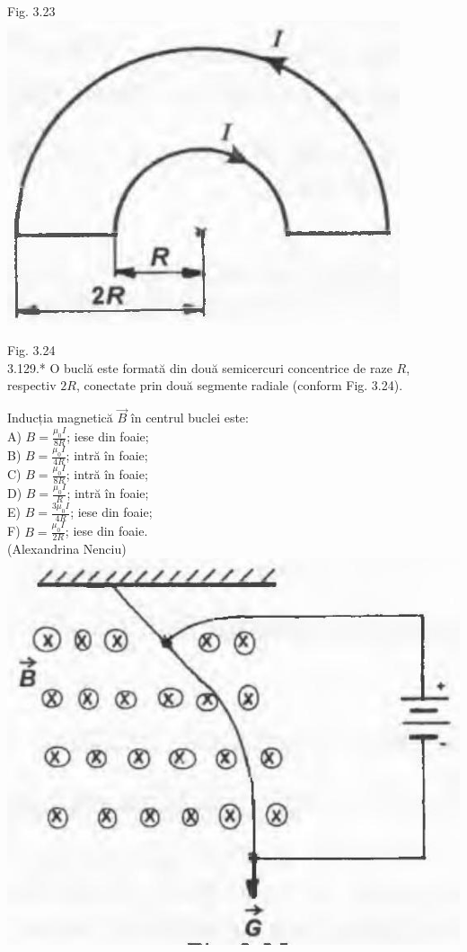 \documentclass[10pt]{article}
\begin{document}
Fig. 3.23\\
\includegraphics[max width=\textwidth, center]{2025_07_01_5b3ff9fa0d508c8e9f17g-171(2)}

Fig. 3.24\\
3.129.* O buclă este formată din două semicercuri concentrice de raze $R$, respectiv $2 R$, conectate prin două segmente radiale (conform Fig. 3.24).

Inducția magnetică $\vec{B}$ în centrul buclei este:\\
A) $B=\frac{\mu_{0} I}{8 R}$; iese din foaie;\\
B) $B=\frac{\mu_{0} I}{4 R}$; intră în foaie;\\
C) $B=\frac{\mu_{0} I}{8 R}$; intră în foaie;\\
D) $B=\frac{\mu_{0} I}{R}$; intră în foaie;\\
E) $B=\frac{3 \mu_{0} I}{4 R}$; iese din foaie;\\
F) $B=\frac{\mu_{0} I}{2 R}$; iese din foaie.\\
(Alexandrina Nenciu)\\
\includegraphics[max width=\textwidth, center]{2025_07_01_5b3ff9fa0d508c8e9f17g-172}
\end{document}
